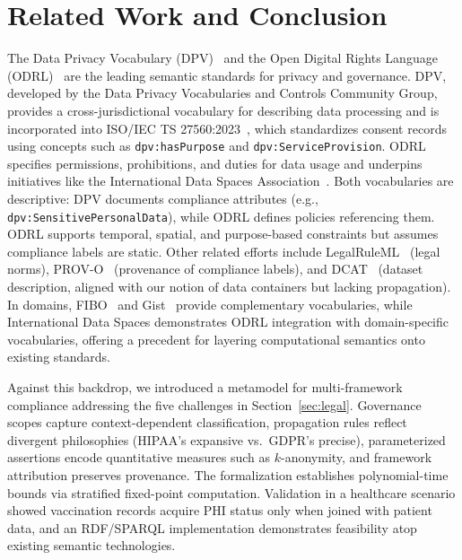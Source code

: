\documentclass{IOS-Book-Article}
\begin{document}
\enlargethispage{-0.5\baselineskip}

\section{Related Work and Conclusion}\label{sec:related-conclusion}

The Data Privacy Vocabulary (DPV)~\cite{pandit2019dpv} and the Open Digital Rights Language (ODRL)~\cite{odrl-model-2018,odrl-vocab-2018} are the leading semantic standards for privacy and governance. DPV, developed by the Data Privacy Vocabularies and Controls Community Group, provides a cross-jurisdictional vocabulary for describing data processing and is incorporated into ISO/IEC TS 27560:2023~\cite{iso27560}, which standardizes consent records using concepts such as \texttt{dpv:hasPurpose} and \texttt{dpv:ServiceProvision}. ODRL specifies permissions, prohibitions, and duties for data usage and underpins initiatives like the International Data Spaces Association~\cite{bader2020}. Both vocabularies are descriptive: DPV documents compliance attributes (e.g., \texttt{dpv:SensitivePersonalData}), while ODRL defines policies referencing them. ODRL supports temporal, spatial, and purpose-based constraints but assumes compliance labels are static. Other related efforts include LegalRuleML~\cite{legalruleml} (legal norms), PROV-O~\cite{prov-o} (provenance of compliance labels), and DCAT~\cite{dcat} (dataset description, aligned with our notion of data containers but lacking propagation). In domains, FIBO~\cite{fibo} and Gist~\cite{gist} provide complementary vocabularies, while International Data Spaces demonstrates ODRL integration with domain-specific vocabularies, offering a precedent for layering computational semantics onto existing standards. 

Against this backdrop, we introduced a metamodel for multi-framework compliance addressing the five challenges in Section~\ref{sec:legal}. Governance scopes capture context-dependent classification, propagation rules reflect divergent philosophies (HIPAA’s expansive vs.\ GDPR’s precise), parameterized assertions encode quantitative measures such as $k$-anonymity, and framework attribution preserves provenance. The formalization establishes polynomial-time bounds via stratified fixed-point computation. Validation in a healthcare scenario showed vaccination records acquire PHI status only when joined with patient data, and an RDF/SPARQL implementation demonstrates feasibility atop existing semantic technologies. 
\end{document}
